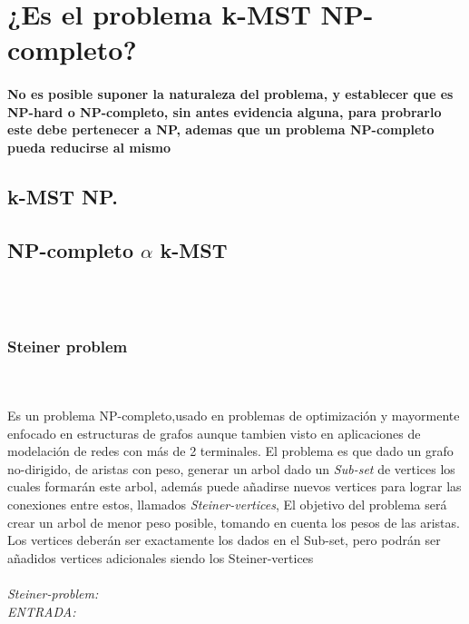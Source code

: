 \documentclass[preprint,12pt]{elsarticle}
\begin{document}
\section{¿Es el problema k-MST NP-completo?}

\paragraph{\textnormal{No es posible suponer la naturaleza del problema, y establecer que es NP-hard o NP-completo, sin antes evidencia alguna, para probrarlo este debe pertenecer a NP, ademas que un problema NP-completo pueda reducirse al mismo}}


\subsection{k-MST \in NP.}

\subsection{NP-completo $\alpha$  k-MST}\\\\



\subsubsection{Steiner problem}\\\\

\textnormal{Es un problema NP-completo,usado en problemas de optimización y mayormente enfocado en estructuras de grafos aunque tambien visto en aplicaciones de modelación de redes con más de 2 terminales. El problema es que dado un grafo no-dirigido, de aristas con peso, generar un arbol dado un
\textit{Sub-set} de vertices los cuales formarán este arbol, además puede añadirse nuevos vertices para lograr las conexiones entre estos, llamados \textit{Steiner-vertices}, El objetivo del problema será crear un arbol de menor peso posible, tomando en cuenta los pesos de las aristas. Los vertices deberán ser exactamente los dados en el Sub-set, pero podrán ser añadidos vertices adicionales siendo los Steiner-vertices}\\\\

\textit{ Steiner-problem:}\\

\textit{ENTRADA: }
\end{document}
